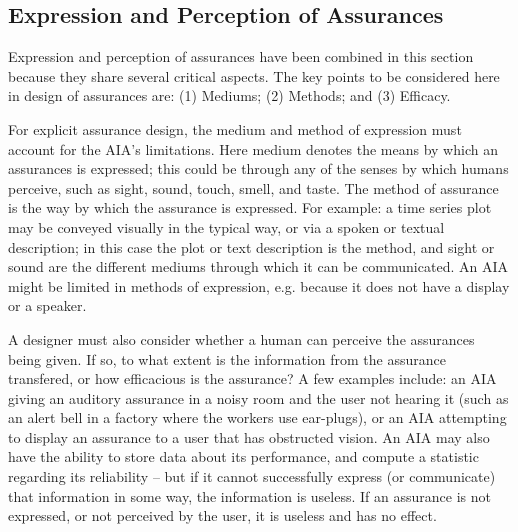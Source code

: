 \subsection{Expression and Perception of Assurances} \label{sec:express_assurances}
Expression and perception of assurances have been combined in this section because they share several critical aspects. The key points to be considered here in design of assurances are:
(1) Mediums; (2) Methods; and (3) Efficacy.     
    
For explicit assurance design, the medium and method of expression must account for the AIA's limitations. 
Here medium denotes the means by which an assurances is expressed; this could be through any of the senses by which humans perceive, such as sight, sound, touch, smell, and taste. The method of assurance is the way by which the assurance is expressed. For example: a time series plot may be conveyed visually in the typical way, or via a spoken or textual description; in this case the plot or text description is the method, and sight or sound are the different mediums through which it can be communicated. An AIA might be limited in methods of expression, e.g. because it does not have a display or a speaker. %

A designer must also consider whether a human can perceive the assurances being given. If so, to what extent is the information from the assurance transfered, or how efficacious is the assurance? A few examples include: an AIA giving an auditory assurance in a noisy room and the user not hearing it (such as an alert bell in a factory where the workers use ear-plugs), or an AIA attempting to display an assurance to a user that has obstructed vision. 
An AIA may also have the ability to store data about its performance, and compute a statistic regarding its reliability -- but if it cannot successfully express (or communicate) that information in some way, the information is useless. 
If an assurance is not expressed, or not perceived by the user, it is useless and has no effect. 

